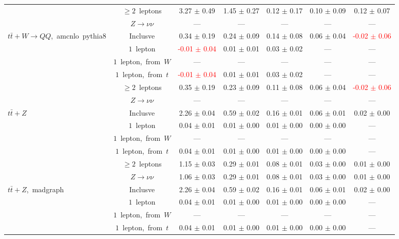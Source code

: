 \documentclass{article}
\begin{document}
\begin{longtable}{|l|c|c|c|c|c|c|}
 & $\ge2$~leptons  & 3.27 $\pm$ 0.49  & 1.45 $\pm$ 0.27  & 0.12 $\pm$ 0.17  & 0.10 $\pm$ 0.09  & 0.12 $\pm$ 0.07 \\* 
 & $Z\rightarrow\nu\nu$  & ---  & ---  & ---  & ---  & --- \\* 
\hline 
\multirow{6}{*}{$t\bar{t}+W{\rightarrow}QQ$,~amcnlo~pythia8} & Inclusve  & 0.34 $\pm$ 0.19  & 0.24 $\pm$ 0.09  & 0.14 $\pm$ 0.08  & 0.06 $\pm$ 0.04  & \textcolor{red}{ -0.02 $\pm$ 0.06 } \\* 
 & $1$~lepton  & \textcolor{red}{ -0.01 $\pm$ 0.04 }  & 0.01 $\pm$ 0.01  & 0.03 $\pm$ 0.02  & ---  & --- \\* 
 & $1$~lepton,~from~$W$  & ---  & ---  & ---  & ---  & --- \\* 
 & $1$~lepton,~from~$t$  & \textcolor{red}{ -0.01 $\pm$ 0.04 }  & 0.01 $\pm$ 0.01  & 0.03 $\pm$ 0.02  & ---  & --- \\* 
 & $\ge2$~leptons  & 0.35 $\pm$ 0.19  & 0.23 $\pm$ 0.09  & 0.11 $\pm$ 0.08  & 0.06 $\pm$ 0.04  & \textcolor{red}{ -0.02 $\pm$ 0.06 } \\* 
 & $Z\rightarrow\nu\nu$  & ---  & ---  & ---  & ---  & --- \\* 
\hline 
\multirow{6}{*}{$t\bar{t}+Z$} & Inclusve  & 2.26 $\pm$ 0.04  & 0.59 $\pm$ 0.02  & 0.16 $\pm$ 0.01  & 0.06 $\pm$ 0.01  & 0.02 $\pm$ 0.00 \\* 
 & $1$~lepton  & 0.04 $\pm$ 0.01  & 0.01 $\pm$ 0.00  & 0.01 $\pm$ 0.00  & 0.00 $\pm$ 0.00  & --- \\* 
 & $1$~lepton,~from~$W$  & ---  & ---  & ---  & ---  & --- \\* 
 & $1$~lepton,~from~$t$  & 0.04 $\pm$ 0.01  & 0.01 $\pm$ 0.00  & 0.01 $\pm$ 0.00  & 0.00 $\pm$ 0.00  & --- \\* 
 & $\ge2$~leptons  & 1.15 $\pm$ 0.03  & 0.29 $\pm$ 0.01  & 0.08 $\pm$ 0.01  & 0.03 $\pm$ 0.00  & 0.01 $\pm$ 0.00 \\* 
 & $Z\rightarrow\nu\nu$  & 1.06 $\pm$ 0.03  & 0.29 $\pm$ 0.01  & 0.08 $\pm$ 0.01  & 0.03 $\pm$ 0.00  & 0.01 $\pm$ 0.00 \\* 
\hline 
\multirow{6}{*}{$t\bar{t}+Z$,~madgraph} & Inclusve  & 2.26 $\pm$ 0.04  & 0.59 $\pm$ 0.02  & 0.16 $\pm$ 0.01  & 0.06 $\pm$ 0.01  & 0.02 $\pm$ 0.00 \\* 
 & $1$~lepton  & 0.04 $\pm$ 0.01  & 0.01 $\pm$ 0.00  & 0.01 $\pm$ 0.00  & 0.00 $\pm$ 0.00  & --- \\* 
 & $1$~lepton,~from~$W$  & ---  & ---  & ---  & ---  & --- \\* 
 & $1$~lepton,~from~$t$  & 0.04 $\pm$ 0.01  & 0.01 $\pm$ 0.00  & 0.01 $\pm$ 0.00  & 0.00 $\pm$ 0.00  & --- \\* 

\end{longtable}
\end{document}
